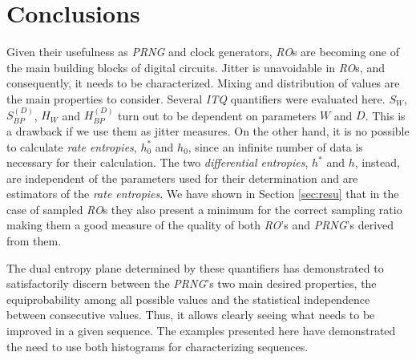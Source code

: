 \section{Conclusions}
\label{sec:conclu}
Given their usefulness as \emph{PRNG} and clock generators, \emph{RO}s are becoming one of the main building blocks of digital circuits. Jitter is unavoidable in \emph{RO}s, and consequently, it needs to be characterized. Mixing and distribution of values are the main properties to consider. 
Several \emph{ITQ} quantifiers were evaluated here. $S_W$, $S^{(D)}_{BP}$, $H_W$ and $H^{(D)}_{BP}$ turn out to be dependent on parameters $W$ and $D$. This is a drawback if we use them as jitter measures. On the other hand, it is no possible to calculate  \emph{rate entropies}, $h_0^*$ and $h_0$,  since an infinite number of data is necessary for their calculation. The two \emph{differential entropies}, $h^*$ and $h$, instead, are independent of the parameters used for their determination and are estimators of the \emph{rate entropies}. We have shown in Section \ref{sec:resu} that in the case of sampled \emph{RO}s they also present a minimum for the correct sampling ratio making them a good measure of the quality of both \emph{RO}'s and \emph{PRNG}'s derived from them. 

The dual entropy plane determined by these quantifiers has demonstrated to satisfactorily discern between the \emph{PRNG}'s two main desired properties, the equiprobability among all possible values and the statistical independence between consecutive values. Thus, it allows clearly seeing what needs to be improved in a given sequence.
The examples presented here have demonstrated the need to use both histograms for characterizing sequences.


